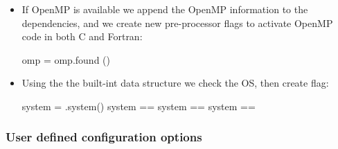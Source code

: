 \begin{itemize}
\item If OpenMP is available we append the OpenMP information to the dependencies, 
and we create new pre-processor flags to activate OpenMP code in both C and Fortran:
\vspace{-0.25cm}
{\small{
\begin{scripti}
omp = 
 omp.found ()
\end{scripti}
}}
\vspace{-0.75cm}
\item Using the the built-int \href{https://mesonbuild.com/Reference-manual\_builtin\_host\_machine.html#host-machine-information-host\_machine-extends-build\_machine}{} data structure we check the OS, then create flag: 
\vspace{-0.75cm}
{\small{
\begin{scripti}
system = .system()
 system == 
 system == 
 system == 
\end{scripti}
}}
\end{itemize}

\subsubsection*{User defined configuration options}
\label{meson_user_options}

